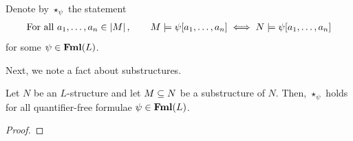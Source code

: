 \begin{boxlnotation}
    Denote by $\star_{\psi}$ the statement
    \begin{align}
        \text{For all } a_1, \ldots, a_n \in \left\lvert M \right\rvert,
        \qquad
        M \models \psi\!\left[ a_1, \ldots, a_n \right]
        \iff
        N \models \psi\!\left[ a_1, \ldots, a_n \right]
    \end{align}
    for some $\psi \in \mathbf{Fml}(L)$.
\end{boxlnotation}

Next, we note a fact about substructures.

\begin{boxlemma}\label{Ch1:Lemma:Tarski-Vaught-star-psi}
    Let $N$ be an $L$-structure and let $M \subseteq N$ be a substructure of $N$. Then, $\star_{\psi}$ holds for all quantifier-free formulae $\psi \in \mathbf{Fml}(L)$.
\end{boxlemma}
\begin{proof}
    \sorry
\end{proof}

